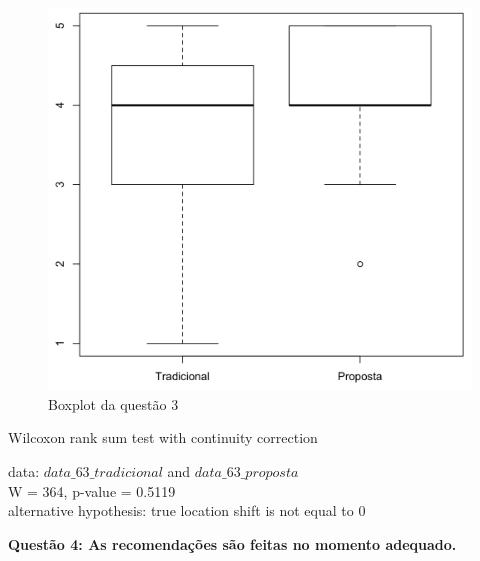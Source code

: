 \begin{figure}[htb]
  \caption{\label{fig:questao3-boxplot}Boxplot da questão 3}
  \begin{center}
      \includegraphics[scale=0.6]{./Figuras/questao3-boxplot.png}
  \end{center}
\end{figure}

Wilcoxon rank sum test with continuity correction

data:  $data\_63\_tradicional$ and $data\_63\_proposta$\\
W = 364, p-value = 0.5119\\
alternative hypothesis: true location shift is not equal to 0

\newpage
\textbf{Questão 4: As recomendações são feitas no momento adequado.}

